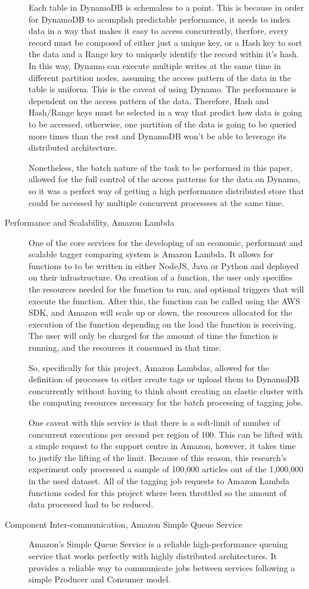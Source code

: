 \begin{description}
Each table in DynamoDB is schemaless to a point. 
This is because in order for DynamoDB to acomplish predictable performance, it needs to index data in a way that makes it easy to access concurrently, therfore, every record must be composed of either just a unique key, or a Hash key to sort the data and a Range key to uniquely identify the record within it's hash.
In this way, Dynamo can execute multiple writes at the same time in different partition nodes, assuming the access pattern of the data in the table is uniform.
This is the caveat of using Dynamo.
The performance is dependent on the access pattern of the data.
Therefore, Hash and Hash/Range keys must be selected in a way that predict how data is going to be accessed, otherwise, one partition of the data is going to be queried more times than the rest and DynamoDB won't  be able to leverage its distributed architecture.

Nonetheless, the batch nature of the task to be performed in this paper, allowed for the full control of the access patterns for the data on Dynamo,
so it was a perfect way of getting a high performance distributed store that could be accessed by multiple concurrent processses at the same time.
\item[Performance and Scalability, Amazon Lambda]
One of the core services for the developing of an economic, performant and scalable tagger comparing system is Amazon Lambda.
It allows for functions to to be written in either NodeJS, Java or Python and deployed on their infrastructure.
On creation of a function, the user only specifies the resources needed for the function to run, and optional triggers that will execute the function.
After this, the function can be called using the AWS SDK, and Amazon will scale up or down, the resources allocated for the execution of the function
depending on the load the function is receiving.
The user will only be charged for the amount of time the function is running, and the resources it consumed in that time.

So, specifically for this project, Amazon Lambdas, allowed for the definition of processes to either create tags or upload them to DynamoDB concurrently
without having to think about creating an elastic cluster with the computing resources necessary for the batch processing of tagging jobs. 

One caveat with this service is that there is a soft-limit of number of concurrent executions per second per region of 100.
This can be lifted with a simple request to the support centre in Amazon, however, it takes time to justify the lifting of the limit.
Because of this reason, this research's experiment only processed a sample of 100,000 articles out of the 1,000,000 in the used dataset.
All of the tagging job requests to Amazon Lambda functions coded for this project where been throttled so the amount of data processed had to be reduced.
\item[Component Inter-communication, Amazon Simple Queue Service] 
Amazon's Simple Queue Service is a reliable high-performance queuing service that works perfectly with highly distributed architectures.
It provides a reliable way to communicate jobs between services following a simple Producer and Consumer model. 


\end{description}
